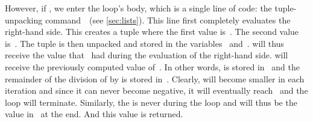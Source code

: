 However, if , we enter the loop's body, which is a single line of code:
the tuple-unpacking command~~(see \cref{sec:lists}).
This line first completely evaluates the right-hand side.
This creates a tuple where the first value is~.
The second value is~.
The tuple is then unpacked and stored in the variables~ and~.
 will thus receive the value that ~had during the evaluation of the right-hand side.
 will receive the previously computed value of~.
In other words,  is stored in~ and the remainder of the division of  by  is stored in~.
Clearly,  will become smaller in each iteration and since it can never become negative, it will eventually reach~ and the loop will terminate.
Similarly, the  is never  during the loop and will thus be the value in~ at the end.
And this value is returned.

